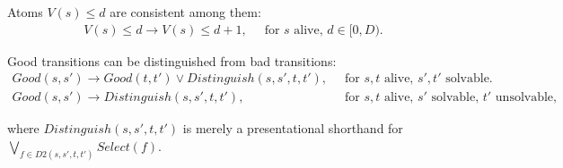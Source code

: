\documentclass[a4paper]{article}
\begin{document}
\noindent Atoms $V(s) \leq d$ are consistent among them:
\begin{align}
 V(s) \leq d \rightarrow V(s) \leq d+1,&\;\; \text{for $s$ alive, $d \in [0, D)$.}
\end{align}

\noindent Good transitions can be distinguished from bad transitions:
\begin{align}
 Good(s, s') \rightarrow Good(t, t') \lor
 Distinguish(s, s', t, t'),&\;\; \text{for $s, t$ alive, $s', t'$ solvable.} \\
 Good(s, s') \rightarrow
 Distinguish(s, s', t, t'),&\;\; \text{for $s, t$ alive, $s'$ solvable, $t'$ unsolvable,}
\end{align}

\noindent where $Distinguish(s, s', t, t')$ is merely a presentational shorthand for $\bigvee_{f \in D2(s, s', t, t')} Select(f)$.




\end{document}
